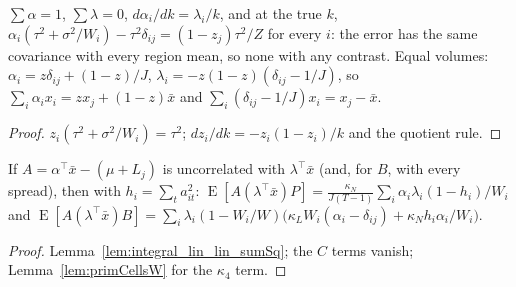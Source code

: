 \begin{lemma}\label{lem:bsAlpha}
  \leanok
  $\sum\alpha = 1$, $\sum\lambda = 0$, $d\alpha_i/dk = \lambda_i/k$, and at the true $k$,
  $\alpha_i(\tau^2 + \sigma^2/W_i) - \tau^2\delta_{ij} = (1 - z_j)\tau^2/Z$ for every $i$: the error has the same
  covariance with every region mean, so none with any contrast. Equal volumes: $\alpha_i = z\delta_{ij} + (1 - z)/J$,
  $\lambda_i = -z(1 - z)(\delta_{ij} - 1/J)$, so $\sum_i\alpha_ix_i = zx_j + (1 - z)\bar x$ and
  $\sum_i(\delta_{ij} - 1/J)x_i = x_j - \bar x$.
\end{lemma}
\begin{proof}
  \leanok
  $z_i(\tau^2 + \sigma^2/W_i) = \tau^2$; $dz_i/dk = -z_i(1 - z_i)/k$ and the quotient rule.
\end{proof}

\begin{lemma}\label{lem:integral_errW}
  \leanok
  If $A = \alpha^\top\bar x - (\mu + L_j)$ is uncorrelated with $\lambda^\top\bar x$ (and, for $B$, with every
  spread), then with $h_i = \sum_ta_{it}^2$:
  $\operatorname{E}[A(\lambda^\top\bar x)P] = \frac{\kappa_N}{J(T - 1)}\sum_i\alpha_i\lambda_i(1 - h_i)/W_i$ and
  $\operatorname{E}[A(\lambda^\top\bar x)B] = \sum_i\lambda_i(1 - W_i/W)\bigl(\kappa_LW_i(\alpha_i - \delta_{ij}) + \kappa_Nh_i\alpha_i/W_i\bigr)$.
\end{lemma}
\begin{proof}
  \leanok
  Lemma~\ref{lem:integral_lin_lin_sumSq}; the $C$ terms vanish; Lemma~\ref{lem:primCellsW} for the $\kappa_4$ term.
\end{proof}

